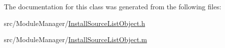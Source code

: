 The documentation for this class was generated from the following files\-:\begin{DoxyCompactItemize}
\item 
src/\-Module\-Manager/\hyperlink{_install_source_list_object_8h}{Install\-Source\-List\-Object.\-h}\item 
src/\-Module\-Manager/\hyperlink{_install_source_list_object_8m}{Install\-Source\-List\-Object.\-m}\end{DoxyCompactItemize}
